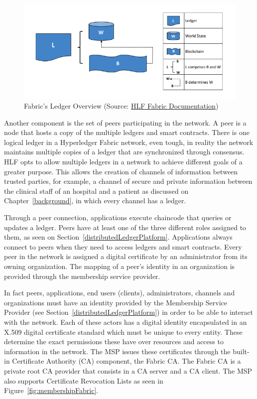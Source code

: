 \begin{figure}[ht] 
	\centering
	\includegraphics[width=1\linewidth]{imgs/ledgerFabric.png}
  \caption{\label{fig:ledgerFabric}Fabric's Ledger Overview (Source:
  \href{https://hyperledger-fabric.readthedocs.io/en/release-1.2/ledger/ledger.html}{HLF
  Fabric Documentation})}
\end{figure}

Another component is the set of peers participating in the network. A peer is a
node that hosts a copy of the multiple ledgers and smart contracts. There is
one logical ledger in a Hyperledger Fabric network, even tough, in reality the
network maintains multiple copies of a ledger that are synchronized through
consensus. HLF opts to allow multiple ledgers in a network to achieve different
goals of a greater purpose. This allows the creation of channels of information
between trusted parties, for example, a channel of secure and private
information between the clinical staff of an hospital and a patient as
discussed on Chapter~\ref{background}, in which every channel has a ledger.

Through a peer connection, applications execute chaincode that queries or
updates a ledger. Peers have at least one of the three different roles assigned
to them, as seen on Section~\ref{distributedLedgerPlatform}. Applications
always connect to peers when they need to access ledgers and smart contracts.
Every peer in the network is assigned a digital certificate by an administrator
from its owning organization. The mapping of a peer's identity in an
organization is provided through the membership service provider. 

In fact peers, applications, end users (clients), administrators, channels and
organizations must have an identity provided by the Membership Service Provider
(see Section~\ref{distributedLedgerPlatform}) in order to be able to interact
with the network. Each of these actors has a digital identity encapsulated in
an X.509 digital certificate standard which must be unique to every entity.
These determine the exact permissions these have over resources and access to
information in the network. The MSP issues these certificates through the
built-in Certificate Authority (CA) component, the Fabric CA. The Fabric CA is
a private root CA provider that consists in a CA server and a CA client. The
MSP also supports Certificate Revocation Lists as seen in
Figure~\ref{fig:membershipFabric}.

